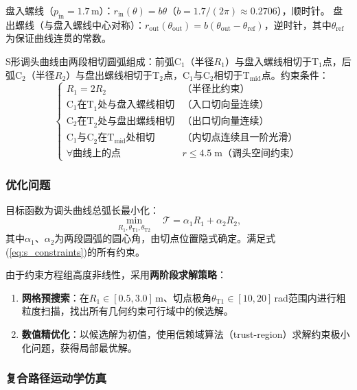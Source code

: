 \documentclass[12pt]{ctexart}
\begin{document}
盘入螺线（$p_{\text{in}}=1.7$\,m）：$r_{\text{in}}(\theta)=b\theta$（$b=1.7/(2\pi)\approx 0.2706$），顺时针。
盘出螺线（与盘入螺线中心对称）：$r_{\text{out}}(\theta_{\text{out}})=b(\theta_{\text{out}}-\theta_{\text{ref}})$，逆时针，其中$\theta_{\text{ref}}$为保证曲线连贯的常数。

S形调头曲线由两段相切圆弧组成：前弧C$_1$（半径$R_1$）与盘入螺线相切于T$_1$点，后弧C$_2$（半径$R_2$）与盘出螺线相切于T$_2$点，C$_1$与C$_2$相切于T$_{\text{mid}}$点。约束条件：
\begin{equation}
\begin{cases}
R_1 = 2R_2 & \text{（半径比约束）}\\
\text{C}_1 \text{在T}_1\text{处与盘入螺线相切} & \text{（入口切向量连续）}\\
\text{C}_2 \text{在T}_2\text{处与盘出螺线相切} & \text{（出口切向量连续）}\\
\text{C}_1 \text{与C}_2 \text{在T}_{\text{mid}}\text{处相切} & \text{（内切点连续且一阶光滑）}\\
\forall \text{曲线上的点} & r \le 4.5\;\text{m（调头空间约束）}
\end{cases}
\label{eq:s_constraints}
\end{equation}

\subsubsection{优化问题}

目标函数为调头曲线总弧长最小化：
\begin{equation}
\min_{R_1,\theta_{\text{T1}},\theta_{\text{T2}}} \quad \mathcal{T} = \alpha_1 R_1 + \alpha_2 R_2,
\label{eq:s_opt}
\end{equation}
其中$\alpha_1$、$\alpha_2$为两段圆弧的圆心角，由切点位置隐式确定。满足式(\ref{eq:s_constraints})的所有约束。

由于约束方程组高度非线性，采用\textbf{两阶段求解策略}：
\begin{enumerate}[label=(\arabic*)]
  \item \textbf{网格预搜索}：在$R_1\in[0.5,3.0]$\,m、切点极角$\theta_{\text{T1}}\in[10,20]$\,rad范围内进行粗粒度扫描，找出所有几何约束可行域中的候选解。
  \item \textbf{数值精优化}：以候选解为初值，使用信赖域算法（trust-region）求解约束极小化问题，获得局部最优解。
\end{enumerate}

\subsubsection{复合路径运动学仿真}
\end{document}
